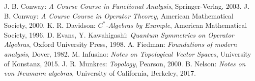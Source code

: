 \begin{thebibliography}
	 J. B. Conway: \emph{A Course Course in Functional Analysis}, Springer-Verlag, 2003.
	 J. B. Conway: \emph{A Course Course in Operator Theorey}, American Mathematical Society, 2000.
	 K. R. Davidson: \emph{$C^{*}$-Algebras by Example}, American Mathematical Society, 1996.
	 D. Evans, Y. Kawahigashi: \emph{Quantum Symmetries on Operator Algebras}, Oxford University Press, 1998.
	 A. Fiedman: \emph{Foundations of modern analysis}, Dover, 1982.
	 M. Infusino: \emph{Notes on Topological Vector Spaces}, University of Konstanz, 2015.
	 J. R. Munkres: \emph{Topology}, Pearson, 2000.
	 B. Nelson: \emph{Notes on von Neumann algebras}, University of California, Berkeley, 2017.
\end{thebibliography}